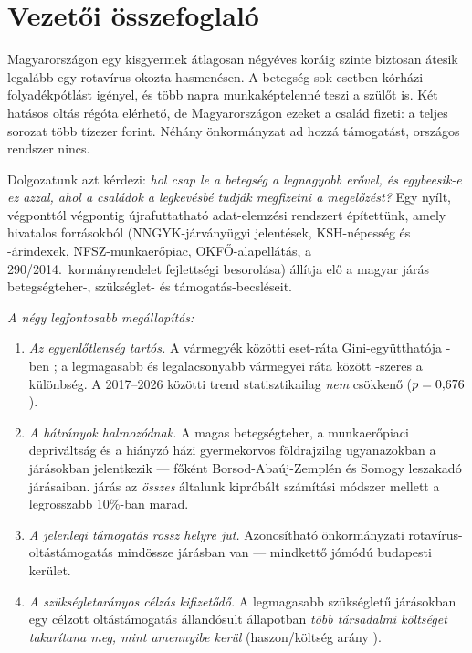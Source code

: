 \documentclass[12pt,a4paper]{article}
\begin{document}
\clearpage
\section*{Vezetői összefoglaló}
\noindent
Magyarországon egy kisgyermek átlagosan négyéves koráig szinte biztosan
átesik legalább egy rotavírus okozta hasmenésen. A betegség sok esetben
kórházi folyadékpótlást igényel, és több napra munkaképtelenné teszi a
szülőt is. Két hatásos oltás régóta elérhető, de Magyarországon ezeket a
család fizeti: a teljes sorozat több tízezer forint. Néhány önkormányzat
ad hozzá támogatást, országos rendszer nincs.

Dolgozatunk azt kérdezi: \emph{hol csap le a betegség a legnagyobb erővel,
és egybeesik-e ez azzal, ahol a családok a legkevésbé tudják megfizetni a
megelőzést?} Egy nyílt, végponttól végpontig újrafuttatható adat-elemzési
rendszert építettünk, amely hivatalos forrásokból (NNGYK-járványügyi
jelentések, KSH-népesség és -árindexek, NFSZ-munkaerőpiac, OKFŐ-alapellátás,
a 290/2014.\ kormányrendelet fejlettségi besorolása) állítja elő a
\nDistricts{} magyar járás betegségteher-, szükséglet- és
támogatás-becsléseit.

\medskip
\noindent\emph{A négy legfontosabb megállapítás:}
\begin{enumerate}[nosep,leftmargin=1.4em]
\item \emph{Az egyenlőtlenség tartós.} A vármegyék közötti eset-ráta
Gini-együtthatója \csYear-ben \giniXs{}; a legmagasabb és legalacsonyabb
vármegyei ráta között \maxminXs-szeres a különbség. A 2017--2026 közötti
trend statisztikailag \emph{nem} csökkenő ($p=0{,}676$).
\item \emph{A hátrányok halmozódnak.} A magas betegségteher, a
munkaerőpiaci depriváltság és a hiányzó házi gyermekorvos földrajzilag
ugyanazokban a járásokban jelentkezik --- főként Borsod-Abaúj-Zemplén és
Somogy leszakadó járásaiban. \nSpecRobust{} járás az \emph{összes} általunk
kipróbált számítási módszer mellett a legrosszabb 10\%-ban marad.
\item \emph{A jelenlegi támogatás rossz helyre jut.} Azonosítható
önkormányzati rotavírus-oltástámogatás mindössze \nDistrictsMuni{} járásban
van --- mindkettő jómódú budapesti kerület.
\item \emph{A szükségletarányos célzás kifizetődő.} A legmagasabb
szükségletű járásokban egy célzott oltástámogatás állandósult állapotban
\emph{több társadalmi költséget takarítana meg, mint amennyibe kerül}
(haszon/költség arány \ceBcrTopNeed).
\end{enumerate}
\end{document}
